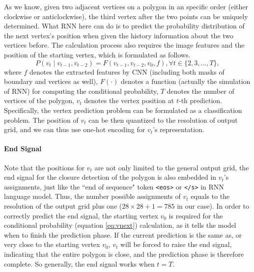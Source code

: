 As we know, given two adjacent vertices on a polygon in an specific order (either clockwise or anticlockwise), the third vertex after the two points can be uniquely determined. What RNN here can do is to predict the probability distribution of the next vertex's position when given the history information about the two vertices before. The calculation process also requires the image features and the position of the starting vertex, which is formulated as follows.
\begin{equation}\label{eq:vnext}
	P(v_t \mid v_{t-1}, v_{t-2}) = F(v_{t-1}, v_{t-2}, v_0, f), \forall t \in \{2,3,\ldots,T\},
\end{equation}
where $f$ denotes the extracted features by CNN (including both masks of boundary and vertices as well), $F(\cdot)$ denotes a function (actually the simulation of RNN) for computing the conditional probability, $T$ denotes the number of vertices of the polygon, $v_t$ denotes the vertex position at $t$-th prediction. Specifically, the vertex prediction problem can be formulated as a classification problem. The position of $v_t$ can be then quantized to the resolution of output grid, and we can thus use one-hot encoding for $v_t$'s representation.

\paragraph{End Signal} Note that the positions for $v_t$ are not only limited to the general output grid, the end signal for the closure detection of the polygon is also embedded in $v_t$'s assignments, just like the ``end of sequence" token \lstinline{<eos>} or \lstinline{</s>} in RNN language model. Thus, the number possible assignments of $v_t$ equals to the resolution of the output grid plus one ($28\times28+1=785$ in our case). In order to correctly predict the end signal, the starting vertex $v_0$ is required for the conditional probability (equation \ref{eq:vnext}) calculation, as it tells the model when to finish the prediction phase. If the current prediction is the same as, or very close to the starting vertex $v_0$, $v_t$ will be forced to raise the end signal, indicating that the entire polygon is close, and the prediction phase is therefore complete. So generally, the end signal works when $t=T$.


